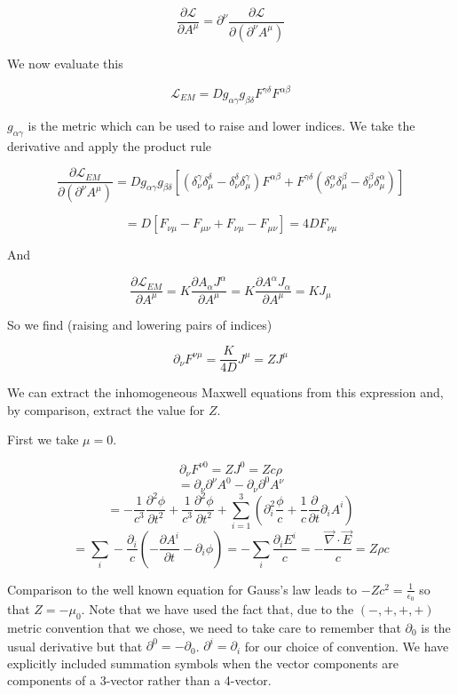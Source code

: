 \documentclass[12pt]{article}
\newcommand{\pardiv}[2][]{\frac{\partial #1}{\partial #2}}
\newcommand{\vecnab}{\vec{\nabla}}
\begin{document}
\[\pardiv[\mathcal{L}]{A^{\mu}} = \partial^{\nu}\pardiv[\mathcal{L}]{(\partial^{\nu}A^{\mu})} \]

We now evaluate this

\[ \mathcal{L}_{EM} = D g_{\alpha \gamma} g_{\beta \delta} F^{\gamma \delta} F^{\alpha \beta} \]

$g_{\alpha \gamma}$ is the metric which can be used to raise and lower indices.
We take the derivative and apply the product rule

\[ \pardiv[\mathcal{L}_{EM}]{(\partial^{\nu} A^{\mu})} = D  g_{\alpha \gamma} g_{\beta \delta} [(\delta_{\nu}^{\gamma} \delta_{\mu}^{\delta} - \delta_{\nu}^{\delta} \delta_{\mu}^{\gamma})F^{\alpha \beta} + F^{\gamma \delta}(\delta_{\nu}^{\alpha} \delta_{\mu}^{\beta} - \delta_{\nu}^{\beta} \delta_{\mu}^{\alpha} ) ] \]

\[ = D[F_{\nu \mu} - F_{\mu \nu} + F_{\nu \mu} - F_{\mu \nu}] = 4DF_{\nu \mu} \]

And

\[ \pardiv[\mathcal{L}_{EM}]{A^{\mu}} = K \pardiv[A_{\alpha}J^{\alpha}]{A^{\mu}} = K\pardiv[A^{\alpha}J_{\alpha}]{A^{\mu}} = KJ_{\mu} \]

So we find (raising and lowering pairs of indices)

\[\partial_{\nu}F^{\nu \mu} = \frac{K}{4D} J^{\mu} = Z J^{\mu} \]

We can extract the inhomogeneous Maxwell equations from this expression and, by comparison, extract the value for $Z$.

First we take $\mu=0$.

\[ \partial_{\nu} F^{\nu 0} = Z J^0 = Z c \rho \]
\[ = \partial_{\nu} \partial^{\nu} A^0 - \partial_{\nu} \partial^0 A^{\nu} \]
\[ = -\frac{1}{c^3} \pardiv[^2\phi]{t^2} + \frac{1}{c^3} \pardiv[^2\phi]{t^2} +\sum_{i=1}^3 \left(\partial_i^2 \frac{\phi}{c} +\frac{1}{c}\pardiv{t} \partial_i A^i\right) \]
\[ =  \sum_i -\frac{\partial_i}{c}\left(-\pardiv[A^i]{t}-\partial_i \phi\right) = -\sum_i\frac{\partial_i E^i}{c} =  -\frac{\vecnab \cdot \vec{E}}{c} = Z \rho c\]

Comparison to the well known equation for Gauss's law leads to $-Z c^2 = \frac{1}{\epsilon_0}$ so that $Z=-\mu_0$.
Note that we have used the fact that, due to the $(-,+,+,+)$ metric convention that we chose, we need to take care to remember that $\partial_0$ is the usual derivative but that $\partial^0 = -\partial_0$. 
$\partial^i=\partial_i$ for our choice of convention.
We have explicitly included summation symbols when the vector components are components of a 3-vector rather than a 4-vector.
\end{document}
